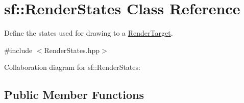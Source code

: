 \hypertarget{classsf_1_1_render_states}{}\section{sf\+:\+:Render\+States Class Reference}
\label{classsf_1_1_render_states}


Define the states used for drawing to a \hyperlink{classsf_1_1_render_target}{Render\+Target}.  




{\ttfamily \#include $<$Render\+States.\+hpp$>$}



Collaboration diagram for sf\+:\+:Render\+States\+:
\subsection*{Public Member Functions}
